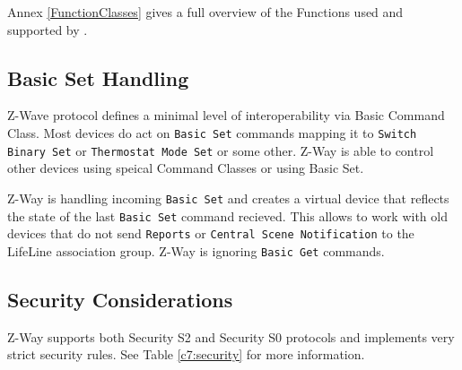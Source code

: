 Annex \ref{FunctionClasses} gives a full overview of the Functions used and supported by \zway .

\subsection{Basic Set Handling}

Z-Wave protocol defines a minimal level of interoperability via Basic
Command Class. Most devices do act on \texttt{Basic Set} commands mapping it
to \texttt{Switch Binary Set} or \texttt{Thermostat Mode Set} or some other.
Z-Way is able to control other devices using speical Command Classes or
using Basic Set.

Z-Way is handling incoming \texttt{Basic Set} and creates a virtual device that
reflects the state of the last \texttt{Basic Set} command recieved. This
allows to work with old devices that do not send \texttt{Reports} or
\texttt{Central Scene Notification} to the LifeLine association group. Z-Way is
ignoring \texttt{Basic Get} commands.

\subsection{Security Considerations}

Z-Way supports both Security S2 and Security S0 protocols and implements
very strict security rules. See Table \ref{c7:security} for more
information.

